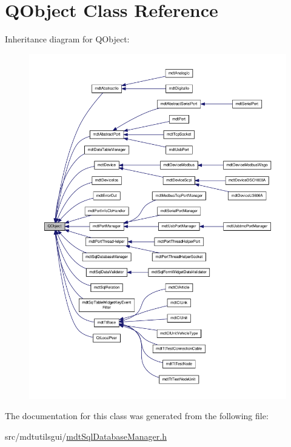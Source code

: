 \hypertarget{class_q_object}{\section{Q\-Object Class Reference}
\label{class_q_object}
}


Inheritance diagram for Q\-Object\-:\nopagebreak
\begin{figure}[H]
\begin{center}
\leavevmode
\includegraphics[width=350pt]{class_q_object__inherit__graph}
\end{center}
\end{figure}


The documentation for this class was generated from the following file\-:\begin{DoxyCompactItemize}
\item 
src/mdtutilsgui/\hyperlink{mdt_sql_database_manager_8h}{mdt\-Sql\-Database\-Manager.\-h}\end{DoxyCompactItemize}
